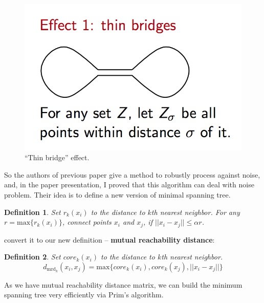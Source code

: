 \documentclass{article}
\newtheorem{definition}{Definition}
\begin{document}
\begin{figure}[h!]
	\centering
	\includegraphics[scale=0.35]{a.png}
	\caption{``Thin bridge'' effect.}
	\label{fig:slabfig}
\end{figure}

So the authors \cite{chaudhuri2010rates} of previous paper give a method to robustly process against noise, and, in the paper presentation, I proved that this algorithm can deal with noise problem. Their idea is to define a new version of minimal spanning tree.

\begin{tcolorbox}
\begin{definition}
Set $r_k(x_i)$ to the distance to $k$th nearest neighbor. For any $r = \text{max}\{r_k(x_i)\}$, connect points $x_i$ and $x_j$, if $||x_i - x_j|| \leq \alpha r$.
\end{definition}
\end{tcolorbox}

\cite{McInnes2017} convert it to our new definition -- \textbf{mutual reachability distance}:

\begin{tcolorbox}
	\begin{definition}
		Set $core_k(x_i)$ to the distance to $k$th nearest neighbor.
		$$d_{\mathrm{mrd}_k}(x_i, x_j) = \text{max}\{core_k(x_i), core_k(x_j), ||x_i - x_j||\}$$
	\end{definition}
\end{tcolorbox}

As we have mutual reachability distance matrix, we can build the minimum spanning tree very efficiently via Prim's algorithm.
\end{document}
